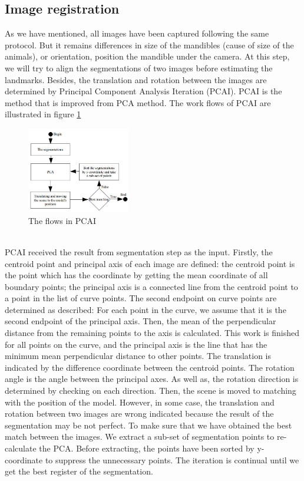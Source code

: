 \documentclass[twoside,twocolumn,10pt]{article}
\begin{document}
\subsection{Image registration}
As we have mentioned, all images have been captured following the same protocol. But it remains differences in size of the mandibles (cause of size of the animals), or orientation, position the mandible under the camera. At this step, we will try to align the segmentations of two images before estimating the landmarks. Besides, the translation and rotation between the images are determined by Principal
Component Analysis Iteration (PCAI). PCAI is the method that is improved from PCA method\cite{shlens2014tutorial}. The work flows of PCAI are illustrated in figure \ref{fig:pcai}
\begin{figure}[htb]
    \centering
    \includegraphics[width=0.4\textwidth]{./images/pcadiagram}
    \caption{The flows in PCAI}
    \label{fig:pcai}
\end{figure}~\\
PCAI received the result from segmentation step as the input. Firstly, the centroid point and principal axis of each image are defined: the centroid point is the point which has the coordinate by getting the mean coordinate of all boundary points; the principal axis is a connected line from the centroid point to a point in the list of curve points. The second endpoint on curve points are determined as described: For each point in the curve, we assume that it is the second endpoint of the principal axis. Then, the mean of the perpendicular distance from the remaining points to the axis is calculated. This work is finished for all points on the curve, and the principal axis is the line that has the minimum mean perpendicular distance to other points. The translation is
indicated by the difference coordinate between the centroid points. The rotation angle is the angle between the principal axes. As well as, the
rotation direction is determined by checking on each direction. Then, the scene is moved to matching with the position of the model. However,
in some case, the translation and rotation between two images are
wrong indicated because the result of the segmentation may be not perfect. To make sure that we have obtained the best match
between the images. We extract a sub-set of segmentation points to re-calculate the PCA. Before extracting, the points have been sorted by y-coordinate to suppress the unnecessary points. The iteration is continual until we get the best register of the segmentation.\\
\end{document}
